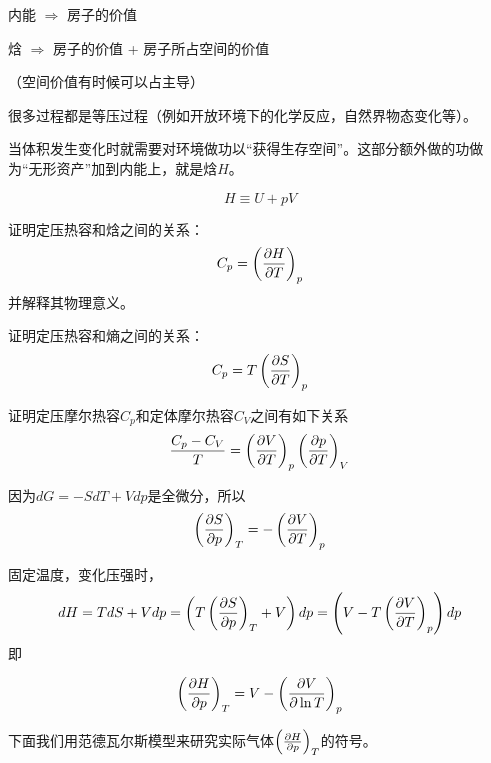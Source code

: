 \documentclass[CJK]{beamer}
\begin{document}
\begin{frame}
\bch

内能 $\Rightarrow$ 房子的价值

\skipline

焓 $\Rightarrow$ 房子的价值 + 房子所占空间的价值



（空间价值有时候可以占主导）


\ech
\end{frame}

\begin{frame}
\bch


很多过程都是等压过程（例如开放环境下的化学反应，自然界物态变化等）。

\hspace{0.1in}

当体积发生变化时就需要对环境做功以“获得生存空间”。这部分额外做的功做为“无形资产”加到内能上，就是焓$H$。

$$ H  \equiv U + pV$$ 

\ech
\end{frame}



\begin{frame}
\bch
{}

证明定压热容和焓之间的关系：
$$ C_p = \left(\frac{\partial H}{\partial T}\right)_{p} $$
并解释其物理意义。
\ech
\end{frame}

\begin{frame}
\bch
{}

证明定压热容和熵之间的关系：
$$ C_p = T\left(\frac{\partial S}{\partial T}\right)_{p} $$

\ech
\end{frame}


\begin{frame}
\bch


证明定压摩尔热容$C_p$和定体摩尔热容$C_V$之间有如下关系
{\blue
$$\frac{C_p-C_V}{T} =  \left(\frac{\partial V}{\partial T}\right)_{p} \left(\frac{\partial p}{\partial T}\right)_{V}$$
}

\ech
\end{frame}




\begin{frame}
\bch
因为$d G = - SdT + Vdp$是全微分，所以
{\blue
$$ \left(\frac{\partial S}{\partial p}\right)_{T} = - \left(\frac{\partial V}{\partial T}\right)_{p}$$
}

固定温度，变化压强时，
$$ dH = TdS + Vdp = \left( T\left(\frac{\partial S}{\partial p}\right)_{T} + V\right) dp = \left( V - T\left(\frac{\partial V}{\partial T}\right)_{p}\right) dp$$
即

{\blue
$$\left(\frac{\partial H}{\partial p}\right)_{T} = V - \left(\frac{\partial V}{\partial \ln T}\right)_{p}$$  
}

下面我们用范德瓦尔斯模型来研究实际气体$\left(\frac{\partial H}{\partial p}\right)_{T}$的符号。

\ech
\end{frame}
\end{document}
